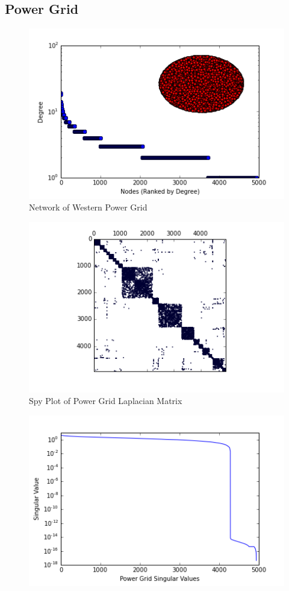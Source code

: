 \documentclass{article}
\begin{document}
\subsection{Power Grid}

\begin{figure}[H]
\centering

\includegraphics[width=.8\linewidth]{power_degree_histogram.png}
\caption{Network of Western Power Grid}
  
\end{figure}

\begin{figure}[H]
\centering
\includegraphics[width = \linewidth]{powerspy.png}
\caption{Spy Plot of Power Grid Laplacian Matrix}
\end{figure}

\begin{figure}[H]
\centering
\includegraphics[width = .9\linewidth]{powersing.png}
\end{figure}
\end{document}
